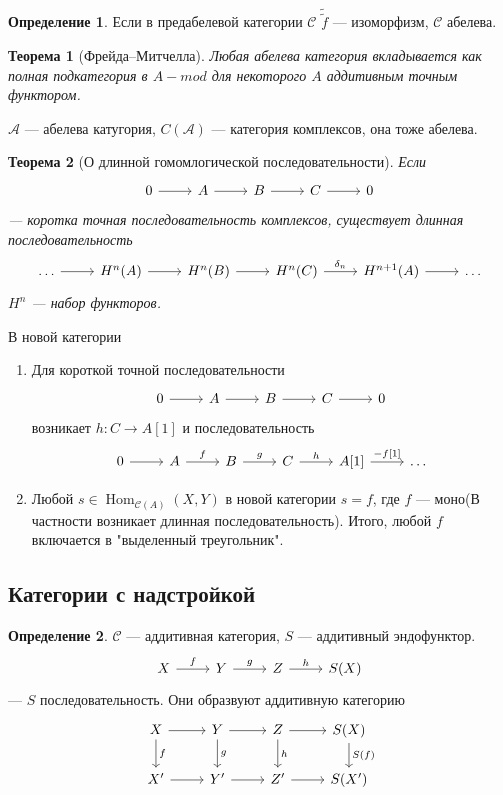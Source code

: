 \documentclass{article}
\newtheorem*{theorem}{Теорема}
\theoremstyle{definition}
\newtheorem*{definition}{Определение}
\theoremstyle{remark}
\DeclareMathOperator{\Hom}{Hom}
\newcommand{\Cat}{\mathcal{C}}
\newcommand{\A}{\mathcal{A}}
\newenvironment{enum}[2][\parindent]{\begin{enumerate}[nosep, wide, labelindent = #1, label=#2]}{\end{enumerate}}
\newenvironment{cd}{\begin{equation*}\begin{tikzcd}}{\end{tikzcd}\end{equation*}}
\begin{document}
\begin{definition}
    Если в предабелевой категории $\Cat$ $\tilde{\tilde{f}}$ --- изоморфизм, $\Cat$ абелева.
\end{definition}

\begin{theorem}[Фрейда--Митчелла]
    Любая абелева категория вкладывается как полная подкатегория в $A-mod$ для некоторого $A$ аддитивным точным функтором.
\end{theorem}

$\A$ --- абелева катугория, $C(\A)$ --- категория комплексов, она тоже абелева.

\begin{theorem}[О длинной гомомлогической последовательности]
    Если
    \begin{cd}
        0 \rar & A \rar & B \rar & C \rar & 0
    \end{cd}
    --- коротка точная последовательность комплексов, существует длинная последовательность
    \begin{cd}
        \ldots \rar & H^n(A) \rar & H^n(B) \rar & H^n(C) \rar["\delta_n"] & H^{n + 1}(A) \rar & \ldots
    \end{cd}
    $H^n$ --- набор функторов. 
\end{theorem}

В новой категории

\begin{enum}{\arabic*)}
    \item Для короткой точной последовательности
    \begin{cd}
        0 \rar & A \rar & B \rar & C \rar & 0
    \end{cd}
    возникает $h: C \rightarrow A[1]$ и последовательность
    \begin{cd}
        0 \rar & A \rar["f"] & B \rar["g"] & C \rar["h"] & A[1] \rar["{-f[1]}"] & \ldots
    \end{cd}
    \item Любой $s \in \Hom_{\Cat(A)}(X, Y)$ в новой категории $s = f$, где $f$ --- моно(В частности возникает длинная последовательность). Итого, любой $f$ включается в "выделенный треугольник".
\end{enum}

\subsection{Категории с надстройкой}

\begin{definition}
    $\Cat$ --- аддитивная категория, $S$ --- аддитивный эндофунктор.
    \begin{cd}
        X \rar["f"] & Y \rar["g"] & Z \rar["h"] & S(X)
    \end{cd}
    --- $S$ последовательность. Они образвуют аддитивную категорию
    \begin{cd}
        X \dar["f"] \rar & Y \dar["g"] \rar & Z \dar["h"] \rar & S(X) \dar["S(f)"] \\
        X' \rar & Y' \rar & Z' \rar & S(X')
    \end{cd}
\end{definition}
\end{document}
